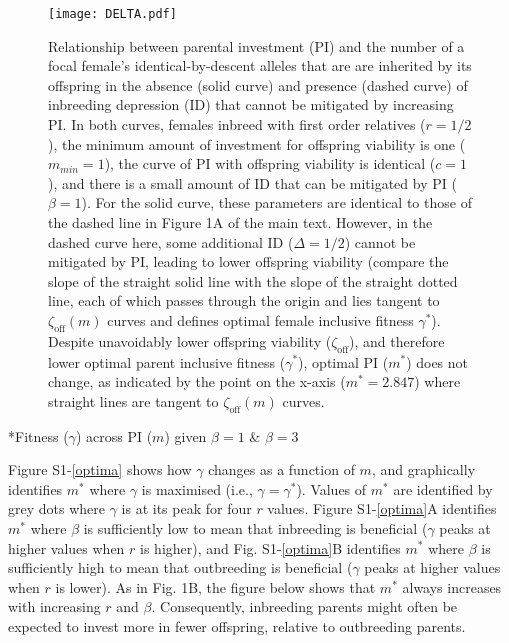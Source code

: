 \documentclass[12pt]{article}
\makeatletter
\renewcommand\section{\@startsection{section}{1}{0in}{-0.5\baselineskip}{0.1\baselineskip}{\normalfont\large\bfseries}}
\makeatother
\begin{document}
\begin{figure}
\begin{center}				
\texttt{[image: DELTA.pdf]}
\end{center}
\caption{Relationship between parental investment (PI) and the number of a focal female's identical-by-descent alleles that are are inherited by its offspring in the absence (solid curve) and presence (dashed curve) of inbreeding depression (ID) that cannot be mitigated by increasing PI. In both curves, females inbreed with first order relatives ($r=1/2$), the minimum amount of investment for offspring viability is one ($m_{min}=1$), the curve of PI with offspring viability is identical ($c=1$), and there is a small amount of ID that can be mitigated by PI ($\beta=1$). For the solid curve, these parameters are identical to those of the dashed line in Figure 1A of the main text. However, in the dashed curve here, some additional ID ($\Delta=1/2$) cannot be mitigated by PI, leading to lower offspring viability (compare the slope of the straight solid line with the slope of the straight dotted line, each of which passes through the origin and lies tangent to $\zeta_{\textrm{off}}(m)$ curves and defines optimal female inclusive fitness $\gamma^{*}$). Despite unavoidably lower offspring viability ($\zeta_{\textrm{off}}$), and therefore lower optimal parent inclusive fitness ($\gamma^{*}$), optimal PI ($m^{*}$) does not change, as indicated by the point on the x-axis ($m^{*}=2.847$) where straight lines are tangent to $\zeta_{\textrm{off}}(m)$ curves.}
\label{DELTA}
\end{figure}

\clearpage

\section*{Fitness ($\gamma$) across PI ($m$) given $\beta=1$ \& $\beta=3$}

\noindent Figure S1-\ref{optima} shows how $\gamma$ changes as a function of $m$, and graphically identifies $m^{*}$ where $\gamma$ is maximised (i.e., $\gamma = \gamma^{*}$). Values of $m^{*}$ are identified by grey dots where $\gamma$ is at its peak for four $r$ values. Figure S1-\ref{optima}A identifies $m^{*}$ where $\beta$ is sufficiently low to mean that inbreeding is beneficial ($\gamma$ peaks at higher values when $r$ is higher), and Fig. S1-\ref{optima}B identifies $m^{*}$ where $\beta$ is sufficiently high to mean that outbreeding is beneficial ($\gamma$ peaks at higher values when $r$ is lower). As in Fig. 1B, the figure below shows that $m^{*}$ always increases with increasing $r$ and $\beta$. Consequently, inbreeding parents might often be expected to invest more in fewer offspring, relative to outbreeding parents.
\end{document}

